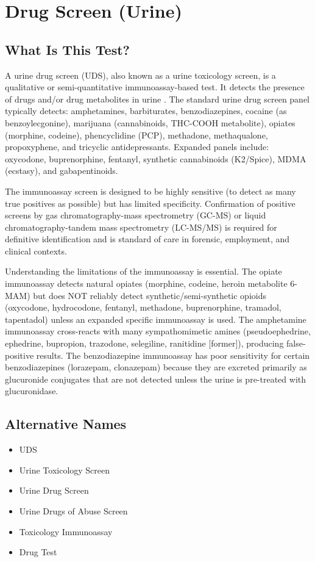 \chapter{Drug Screen (Urine)}
\section*{What Is This Test?}
A urine drug screen (UDS), also known as a urine toxicology screen, is a qualitative or semi-quantitative immunoassay-based test. It detects the presence of drugs and/or drug metabolites in urine \cite{moeller2008urine}. The standard urine drug screen panel typically detects: amphetamines, barbiturates, benzodiazepines, cocaine (as benzoylecgonine), marijuana (cannabinoids, THC-COOH metabolite), opiates (morphine, codeine), phencyclidine (PCP), methadone, methaqualone, propoxyphene, and tricyclic antidepressants. Expanded panels include: oxycodone, buprenorphine, fentanyl, synthetic cannabinoids (K2/Spice), MDMA (ecstasy), and gabapentinoids.

The immunoassay screen is designed to be highly sensitive (to detect as many true positives as possible) but has limited specificity. Confirmation of positive screens by gas chromatography-mass spectrometry (GC-MS) or liquid chromatography-tandem mass spectrometry (LC-MS/MS) is required for definitive identification and is standard of care in forensic, employment, and clinical contexts.

Understanding the limitations of the immunoassay is essential. The opiate immunoassay detects natural opiates (morphine, codeine, heroin metabolite 6-MAM) but does NOT reliably detect synthetic/semi-synthetic opioids (oxycodone, hydrocodone, fentanyl, methadone, buprenorphine, tramadol, tapentadol) unless an expanded specific immunoassay is used. The amphetamine immunoassay cross-reacts with many sympathomimetic amines (pseudoephedrine, ephedrine, bupropion, trazodone, selegiline, ranitidine [former]), producing false-positive results. The benzodiazepine immunoassay has poor sensitivity for certain benzodiazepines (lorazepam, clonazepam) because they are excreted primarily as glucuronide conjugates that are not detected unless the urine is pre-treated with glucuronidase.
\section*{Alternative Names}
\begin{itemize}
  \item UDS
  \item Urine Toxicology Screen
  \item Urine Drug Screen
  \item Urine Drugs of Abuse Screen
  \item Toxicology Immunoassay
  \item Drug Test
\end{itemize}
